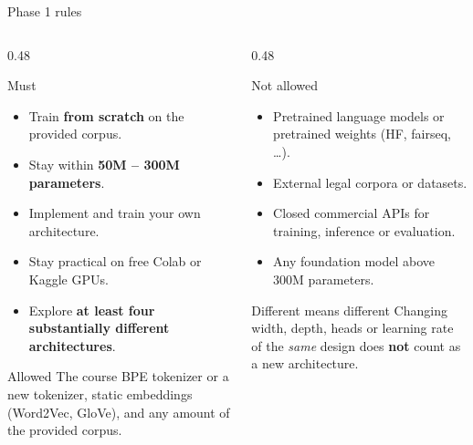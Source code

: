 \documentclass[aspectratio=169,11pt]{beamer}
\begin{document}
\begin{frame}{Phase 1 rules}
  \begin{columns}[T]
    \begin{column}{0.48\textwidth}
      \begin{block}{Must}
        \small
        \begin{itemize}
          \item Train \textbf{from scratch} on the provided corpus.
          \item Stay within \textbf{50M -- 300M parameters}.
          \item Implement and train your own architecture.
          \item Stay practical on free Colab or Kaggle GPUs.
          \item Explore \textbf{at least four substantially different architectures}.
        \end{itemize}
      \end{block}
      \begin{exampleblock}{Allowed}
        \small
        The course BPE tokenizer or a new tokenizer, static embeddings (Word2Vec, GloVe), and any amount of the provided corpus.
      \end{exampleblock}
    \end{column}
    \begin{column}{0.48\textwidth}
      \begin{alertblock}{Not allowed}
        \small
        \begin{itemize}
          \item Pretrained language models or pretrained weights (HF, fairseq, \ldots).
          \item External legal corpora or datasets.
          \item Closed commercial APIs for training, inference or evaluation.
          \item Any foundation model above 300M parameters.
        \end{itemize}
      \end{alertblock}
      \begin{block}{Different means different}
        \small
        Changing width, depth, heads or learning rate of the \emph{same} design does \textbf{not} count as a new architecture.
      \end{block}
    \end{column}
  \end{columns}
\end{frame}
\end{document}
